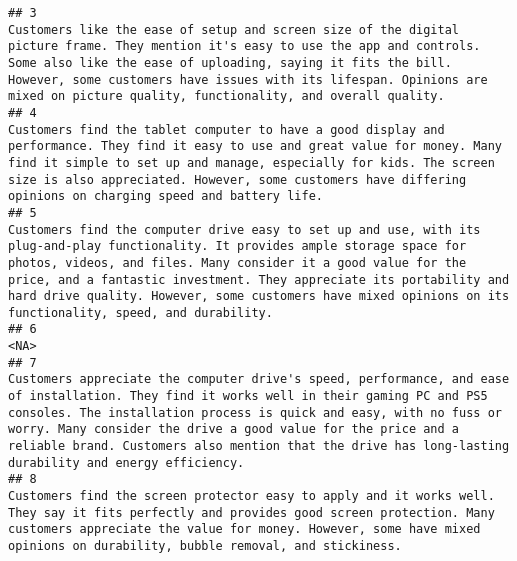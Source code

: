 \documentclass[
]{article}
\begin{document}
\begin{verbatim}
## 3                                                                                                                                                     Customers like the ease of setup and screen size of the digital picture frame. They mention it's easy to use the app and controls. Some also like the ease of uploading, saying it fits the bill. However, some customers have issues with its lifespan. Opinions are mixed on picture quality, functionality, and overall quality.
## 4                                                                                                                                                                  Customers find the tablet computer to have a good display and performance. They find it easy to use and great value for money. Many find it simple to set up and manage, especially for kids. The screen size is also appreciated. However, some customers have differing opinions on charging speed and battery life.
## 5                                                                                                Customers find the computer drive easy to set up and use, with its plug-and-play functionality. It provides ample storage space for photos, videos, and files. Many consider it a good value for the price, and a fantastic investment. They appreciate its portability and hard drive quality. However, some customers have mixed opinions on its functionality, speed, and durability.
## 6                                                                                                                                                                                                                                                                                                                                                                                                                                                                                    <NA>
## 7                                                                                               Customers appreciate the computer drive's speed, performance, and ease of installation. They find it works well in their gaming PC and PS5 consoles. The installation process is quick and easy, with no fuss or worry. Many consider the drive a good value for the price and a reliable brand. Customers also mention that the drive has long-lasting durability and energy efficiency.
## 8                                                                                                                                                                                                                    Customers find the screen protector easy to apply and it works well. They say it fits perfectly and provides good screen protection. Many customers appreciate the value for money. However, some have mixed opinions on durability, bubble removal, and stickiness.

\end{verbatim}
\end{document}
